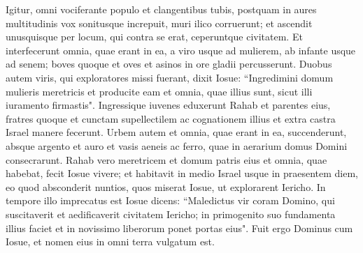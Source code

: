 \begin{biblechapter}
\verse Igitur, omni vociferante populo et clangentibus tubis, postquam in aures multitudinis vox sonitusque increpuit, muri ilico corruerunt; et ascendit unusquisque per locum, qui contra se erat, ceperuntque civitatem. 
\verse Et interfecerunt omnia, quae erant in ea, a viro usque ad mulierem, ab infante usque ad senem; boves quoque et oves et asinos in ore gladii percusserunt.  
\verse Duobus autem viris, qui exploratores missi fuerant, dixit Iosue: “Ingredimini domum mulieris meretricis et producite eam et omnia, quae illius sunt, sicut illi iuramento firmastis". 
\verse Ingressique iuvenes eduxerunt Rahab et parentes eius, fratres quoque et cunctam supellectilem ac cognationem illius et extra castra Israel manere fecerunt. 
\verse Urbem autem et omnia, quae erant in ea, succenderunt, absque argento et auro et vasis aeneis ac ferro, quae in aerarium domus Domini consecrarunt. 
\verse Rahab vero meretricem et domum patris eius et omnia, quae habebat, fecit Iosue vivere; et habitavit in medio Israel usque in praesentem diem, eo quod absconderit nuntios, quos miserat Iosue, ut explorarent Iericho. In tempore illo imprecatus est Iosue dicens: 
\verse “Maledictus vir coram Domino, qui suscitaverit et aedificaverit civitatem Iericho; in primogenito suo fundamenta illius faciet et in novissimo liberorum ponet portas eius". 
\verse Fuit ergo Dominus cum Iosue, et nomen eius in omni terra vulgatum est. 
\end{biblechapter}

